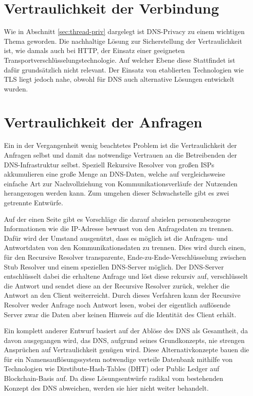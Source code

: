 \section{Vertraulichkeit der Verbindung}
Wie in Abschnitt \ref{sec:thread-priv} dargelegt ist DNS-Privacy zu einem wichtigen Thema geworden. Die nachhaltige Lösung zur Sicherstellung der Vertraulichkeit ist, wie damals auch bei HTTP, der Einsatz einer geeigneten Transportverschlüsselungstechnologie. Auf welcher Ebene diese Stattfindet ist dafür grundsätzlich nicht relevant. Der Einsatz von etablierten Technologien wie TLS liegt jedoch nahe, obwohl für DNS auch alternative Lösungen entwickelt wurden. 



\section{Vertraulichkeit der Anfragen}
\label{sec:solutions-PrivRequest}
Ein in der Vergangenheit wenig beachtetes Problem ist die Vertraulichkeit der Anfragen selbst und damit das notwendige Vertrauen an die Betreibenden der DNS-Infrastruktur selbst. Speziell Rekursive Resolver von großen ISPs akkumulieren eine große Menge an DNS-Daten, welche auf vergleichsweise einfache Art zur Nachvollziehung von Kommunikationsverläufe der Nutzenden herangezogen werden kann. Zum umgehen dieser Schwachstelle gibt es zwei getrennte Entwürfe.

Auf der einen Seite gibt es Vorschläge die darauf abzielen personenbezogene Informationen wie die IP-Adresse bewusst von den Anfragedaten zu trennen. Dafür wird der Umstand ausgenützt, dass es möglich ist die Anfragen- und Antwortdaten von den Kommunikationsdaten zu trennen. Dies wird durch einen, für den Recursive Resolver transparente, Ende-zu-Ende-Verschlüsselung zwischen Stub Resolver und einem speziellen DNS-Server möglich. Der DNS-Server entschlüsselt dabei die erhaltene Anfrage und löst diese rekursiv auf, verschlüsselt die Antwort und sendet diese an der Recursive Resolver zurück, welcher die Antwort an den Client weiterreicht. Durch dieses Verfahren kann der Recursive Resolver weder Anfrage noch Antwort lesen, wobei der eigentlich auflösende Server zwar die Daten aber keinen Hinweis auf die Identität des Client erhält.

Ein komplett anderer Entwurf basiert auf der Ablöse des DNS als Gesamtheit, da davon ausgegangen wird, das DNS, aufgrund seines Grundkonzepts, nie strengen Ansprüchen auf Vertraulichkeit genügen wird. Diese Alternativkonzepte bauen die für ein Namensauflösungssystem notwendige verteile Datenbank mithilfe von Technologien wie Dirstibute-Hash-Tables (DHT) oder Public Ledger auf Blockchain-Basis auf. Da diese Lösungsentwürfe radikal vom bestehenden Konzept des DNS abweichen, werden sie hier nicht weiter behandelt.      

